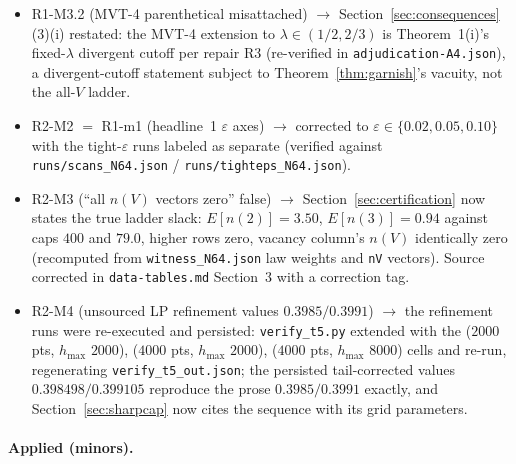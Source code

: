 \documentclass[11pt]{article}
\theoremstyle{plain}
\theoremstyle{definition}
\theoremstyle{remark}
\begin{document}
\begin{itemize}
  phrase (``the $\lambda' = 1/2 + o(1)$ system fixed by the adjudication, R4
  $\theta < 1$ strict; $\lambda' \ge 0.6$ is the quarantined
  Section~\ref{sec:payoff} payoff curve'') added at the end of
  Section~\ref{sec:gatequestion}.
\item R1-M3.2 (MVT-4 parenthetical misattached) $\to$
  Section~\ref{sec:consequences}(3)(i) restated: the MVT-4 extension to
  $\lambda \in (1/2, 2/3)$ is Theorem~1(i)'s fixed-$\lambda$ divergent cutoff per
  repair R3 (re-verified in \texttt{adjudication-A4.json}), a divergent-cutoff
  statement subject to Theorem~\ref{thm:garnish}'s vacuity, not the all-$V$
  ladder.
\item R2-M2 $=$ R1-m1 (headline~1 $\varepsilon$ axes) $\to$ corrected to
  $\varepsilon \in \{0.02, 0.05, 0.10\}$ with the tight-$\varepsilon$ runs
  labeled as separate (verified against \texttt{runs/scans\_N64.json} /
  \texttt{runs/tighteps\_N64.json}).
\item R2-M3 (``all $n(V)$ vectors zero'' false) $\to$
  Section~\ref{sec:certification} now states the true ladder slack:
  $E[n(2)] = 3.50$, $E[n(3)] = 0.94$ against caps $400$ and $79.0$, higher rows
  zero, vacancy column's $n(V)$ identically zero (recomputed from
  \texttt{witness\_N64.json} law weights and \texttt{nV} vectors). Source
  corrected in \texttt{data-tables.md} Section~3 with a correction tag.
\item R2-M4 (unsourced LP refinement values $0.3985/0.3991$) $\to$ the refinement
  runs were re-executed and persisted: \texttt{verify\_t5.py}
  extended with the ($2000$ pts, $h_{\max}$ $2000$), ($4000$ pts, $h_{\max}$
  $2000$), ($4000$ pts, $h_{\max}$ $8000$) cells and re-run, regenerating
  \texttt{verify\_t5\_out.json}; the persisted tail-corrected values
  $0.398498 / 0.399105$ reproduce the prose $0.3985 / 0.3991$ exactly, and
  Section~\ref{sec:sharpcap} now cites the sequence with its grid parameters.
\end{itemize}

\paragraph{Applied (minors).}
\end{document}
